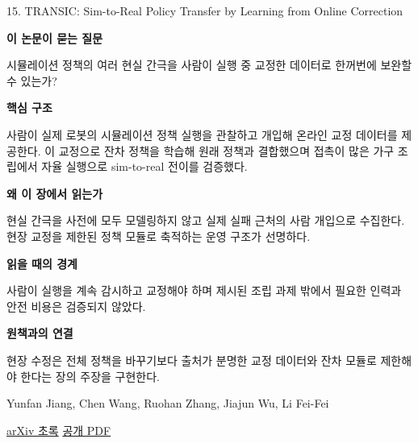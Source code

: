 \documentclass[11pt,openany]{book}
\begin{document}
\begin{termcard}{15. TRANSIC: Sim-to-Real Policy Transfer by Learning from Online Correction}

\par

\medskip

{\sffamily\bfseries\color{deepblue} 이 논문이 묻는 질문}\par

시뮬레이션 정책의 여러 현실 간극을 사람이 실행 중 교정한 데이터로 한꺼번에 보완할 수 있는가?

\smallskip

{\sffamily\bfseries\color{deepblue} 핵심 구조}\par

사람이 실제 로봇의 시뮬레이션 정책 실행을 관찰하고 개입해 온라인 교정 데이터를 제공한다. 이 교정으로 잔차 정책을 학습해 원래 정책과 결합했으며 접촉이 많은 가구 조립에서 자율 실행으로 sim-to-real 전이를 검증했다.

\smallskip

{\sffamily\bfseries\color{deepblue} 왜 이 장에서 읽는가}\par

현실 간극을 사전에 모두 모델링하지 않고 실제 실패 근처의 사람 개입으로 수집한다. 현장 교정을 제한된 정책 모듈로 축적하는 운영 구조가 선명하다.

\smallskip

{\sffamily\bfseries\color{coral} 읽을 때의 경계}\par

사람이 실행을 계속 감시하고 교정해야 하며 제시된 조립 과제 밖에서 필요한 인력과 안전 비용은 검증되지 않았다.

\smallskip

{\sffamily\bfseries\color{teal} 원책과의 연결}\par

현장 수정은 전체 정책을 바꾸기보다 출처가 분명한 교정 데이터와 잔차 모듈로 제한해야 한다는 장의 주장을 구현한다.

\medskip

{\footnotesize\color{muted} Yunfan Jiang, Chen Wang, Ruohan Zhang, Jiajun Wu, Li Fei-Fei\par

\href{https://arxiv.org/abs/2405.10315}{arXiv 초록} \quad \href{https://arxiv.org/pdf/2405.10315}{공개 PDF}\par}

\end{termcard}
\end{document}
